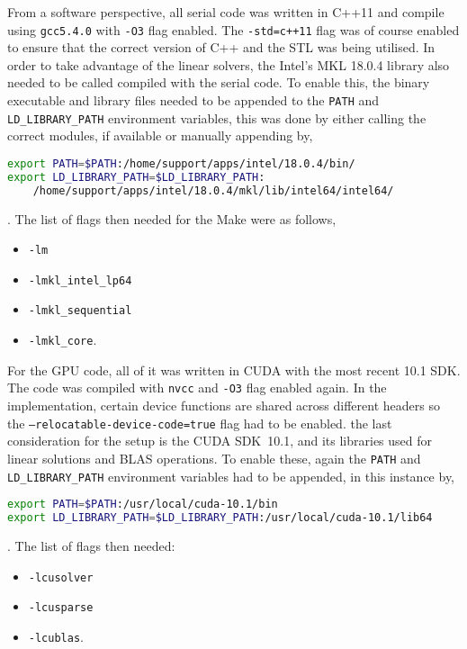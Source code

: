 From a software perspective, all serial code was written in C++11 and compile using \texttt{gcc5.4.0} with \texttt{-O3} flag enabled. The \texttt{-std=c++11} flag was of course enabled to ensure that the correct version of C++ and the STL was being utilised. In order to take advantage of the linear solvers, the Intel's MKL 18.0.4 library also needed to be called compiled with the serial code. To enable this, the binary executable and library files needed to be appended to the \texttt{PATH} and \texttt{LD\_LIBRARY\_PATH} environment variables, this was done by either calling the correct modules, if available or manually appending by,
\begin{lstlisting}[language=bash, basicstyle=\small\ttfamily ]
export PATH=$PATH:/home/support/apps/intel/18.0.4/bin/
export LD_LIBRARY_PATH=$LD_LIBRARY_PATH:
	/home/support/apps/intel/18.0.4/mkl/lib/intel64/intel64/
\end{lstlisting}
. The list of flags then needed for the Make were as follows,
\begin{itemize}
	\item \texttt{-lm}
	\item \texttt{-lmkl\_intel\_lp64}
	\item \texttt{-lmkl\_sequential}
	\item \texttt{-lmkl\_core}.
\end{itemize}

For the GPU code, all of it was written in CUDA with the most recent 10.1 SDK. The code was compiled with \texttt{nvcc} and \texttt{-O3} flag enabled again. In the implementation, certain device functions are shared across different headers so the \texttt{--relocatable-device-code=true} flag had to be enabled. the last consideration for the setup is the CUDA SDK~10.1, and its libraries used for linear solutions and BLAS operations. To enable these, again the \texttt{PATH} and \texttt{LD\_LIBRARY\_PATH} environment variables had to be appended, in this instance by,
\begin{lstlisting}[language=bash, basicstyle=\small\ttfamily ]
export PATH=$PATH:/usr/local/cuda-10.1/bin
export LD_LIBRARY_PATH=$LD_LIBRARY_PATH:/usr/local/cuda-10.1/lib64
\end{lstlisting}
. The list of flags then needed:
\begin{itemize}
	\item \texttt{-lcusolver}
	\item \texttt{-lcusparse}
	\item \texttt{-lcublas}.
\end{itemize}


